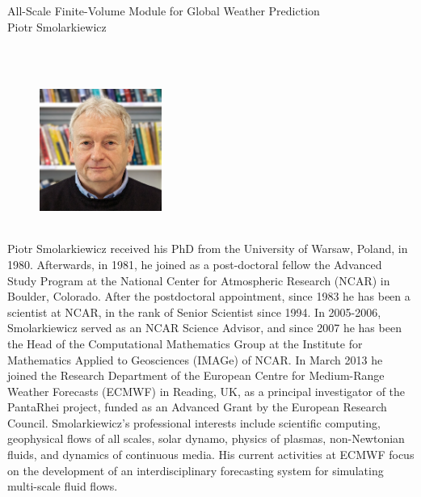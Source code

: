     { 
			{All-Scale Finite-Volume Module for Global Weather Prediction} \\
    \normalfont\small Piotr Smolarkiewicz }
    
    {  \\    
    } 
      {  } 
	\vspace{1cm} 
	\begin{figure}
		\vspace{-20pt}
		\begin{center}
			\includegraphics[width=4cm,height=5cm,keepaspectratio]{invited_img/smolarkiewicz}
		\end{center}
		\vspace{-20pt}
		\vspace{-10pt}
	\end{figure}
	Piotr Smolarkiewicz received his PhD from the University of Warsaw, Poland, in 1980. Afterwards, in 1981, he joined as a post-doctoral fellow the Advanced Study Program at the National Center for Atmospheric Research (NCAR) in Boulder, Colorado. After the postdoctoral appointment, since 1983 he has been a scientist at NCAR, in the rank of Senior Scientist since 1994. In 2005-2006, Smolarkiewicz served as an NCAR Science Advisor, and since 2007 he has been the Head of the Computational Mathematics Group at the Institute for Mathematics Applied to Geosciences (IMAGe) of NCAR. In March 2013 he joined the Research Department of the European Centre for Medium-Range Weather Forecasts (ECMWF) in Reading, UK, as a principal investigator of the PantaRhei project, funded as an Advanced Grant by the European Research Council. Smolarkiewicz's professional interests include scientific computing, geophysical flows of all scales, solar dynamo, physics of plasmas, non-Newtonian fluids, and dynamics of continuous media. His current activities at ECMWF focus on the development of an interdisciplinary forecasting system for simulating multi-scale fluid flows.
	

